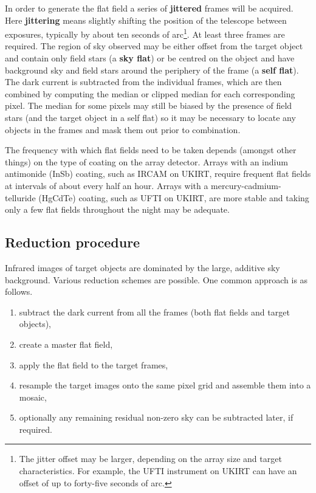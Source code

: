 \documentclass[twoside,11pt]{starlink}
\begin{document}
\begin{description}
   In order to generate the flat field a series of \textbf{jittered} frames
   will be acquired.  Here \textbf{jittering} means slightly shifting the
   position of the telescope between exposures, typically by about ten
   seconds of arc\footnote{The jitter offset may be larger, depending on
   the array size and target characteristics.  For example, the UFTI
   instrument on UKIRT can have an offset of up to forty-five seconds of
   arc.}.  At least three frames are required.  The region of sky observed
   may be either offset from the target object and contain only field stars
   (a \textbf{sky flat}) or be centred on the object and have background sky
   and field stars around the periphery of the frame (a \textbf{self flat}).
   The dark current is subtracted from the individual frames, which are
   then combined by computing the median or clipped median for each
   corresponding pixel.  The median for some pixels may still be biased by
   the presence of field stars (and the target object in a self flat) so
   it may be necessary to locate any objects in the frames and mask them
   out prior to combination.

   The frequency with which flat fields need to be taken depends (amongst
   other things) on the type of coating on the array detector.  Arrays
   with an indium antimonide (InSb) coating, such as IRCAM on UKIRT,
   require frequent flat fields at intervals of about every half an hour.
   Arrays with a mercury-cadmium-telluride (HgCdTe) coating, such as
   UFTI on UKIRT, are more stable and taking only a few flat fields
   throughout the night may be adequate.

\end{description}

\subsection{Reduction procedure}

Infrared images of target objects are dominated by the large, additive
sky background.  Various reduction schemes are possible.  One common
approach is as follows.

\begin{enumerate}

  \item subtract the dark current from all the frames (both flat fields
   and target objects),

  \item create a master flat field,

  \item apply the flat field to the target frames,

  \item resample the target images onto the same pixel grid and assemble
   them into a mosaic,

  \item optionally any remaining residual non-zero sky can be subtracted
   later, if required.

\end{enumerate}
\end{document}
